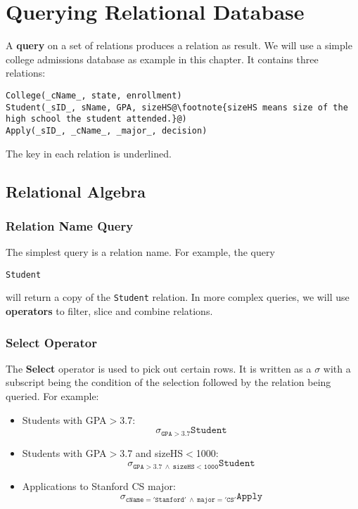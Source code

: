 \ifx\PREAMBLE\undefined


\fi
\chapter{Querying Relational Database}
A \textbf{query} on a set of relations produces a relation as result. We will use a simple college admissions database as example in this chapter. It contains three relations:
\begin{lstlisting}[escapechar=@]
College(_cName_, state, enrollment)
Student(_sID_, sName, GPA, sizeHS@\footnote{sizeHS means size of the high school the student attended.}@)
Apply(_sID_, _cName_, _major_, decision)
\end{lstlisting}
The key in each relation is underlined.
\section{Relational Algebra}
\subsection{Relation Name Query}
The simplest query is a relation name. For example, the query
\begin{center}
\texttt{Student}
\end{center}
will return a copy of the \texttt{Student} relation. In more complex queries, we will use \textbf{operators} to filter, slice and combine relations.
\subsection{Select Operator}
The \textbf{Select} operator is used to pick out certain rows. It is written as a $\sigma$ with a subscript being the condition of the selection followed by the relation being queried. For example:
\begin{itemize}
\item Students with GPA$>$3.7: $$\mathtt{\sigma_{GPA>3.7}Student}$$
\item Students with GPA$>$3.7 and sizeHS$<$1000: $$\mathtt{\sigma_{GPA>3.7\:\land\: sizeHS<1000}Student}$$
\item Applications to Stanford CS major: $$\mathtt{\sigma_{cName='Stanford'\:\land\: major='CS'}Apply}$$
\end{itemize}
